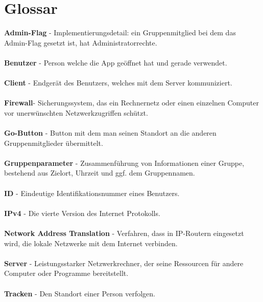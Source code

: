 \section{Glossar}
\textbf{Admin-Flag} - Implementierungsdetail: ein Gruppenmitglied bei dem das Admin-Flag gesetzt ist, hat Administratorrechte.\\
\\
\textbf{Benutzer} - Person welche die App geöffnet hat und gerade verwendet.\\
\\
\textbf{Client} - Endgerät des Benutzers, welches mit dem Server kommuniziert.\\
\\
\textbf{Firewall}- Sicherungssystem, das ein Rechnernetz oder einen einzelnen Computer vor unerwünschten Netzwerkzugriffen schützt.\\
\\
\textbf{Go-Button} - Button mit dem man seinen Standort an die anderen Gruppenmitglieder übermittelt.\\
\\
\textbf{Gruppenparameter} - Zusammenführung von Informationen einer Gruppe, bestehend aus Zielort, Uhrzeit und ggf. dem Gruppennamen.\\
\\
\textbf{ID} - Eindeutige Identifikationsnummer eines Benutzers.\\
\\
\textbf{IPv4} - Die vierte Version des Internet Protokolls.\\
\\
\textbf{Network Address Translation} - Verfahren, dass in IP-Routern eingesetzt wird, die lokale Netzwerke mit dem Internet verbinden.\\
\\
\textbf{Server} - Leistungsstarker Netzwerkrechner, der seine Ressourcen für andere Computer oder Programme bereitstellt.\\
\\
\textbf{Tracken} - Den Standort einer Person verfolgen.\\
\\


